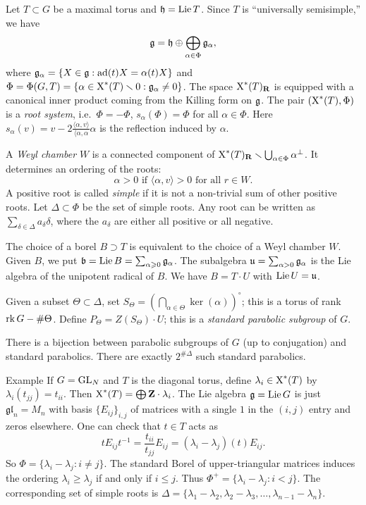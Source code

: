 Let $T\subset G$ be a maximal torus and $\mathfrak{h}=\operatorname{Lie} T$. Since $T$ is 
``universally semisimple,'' we have 
\[
  \mathfrak{g} = \mathfrak{h}\oplus \bigoplus_{\alpha\in \Phi} \mathfrak{g}_\alpha,
\]
where $\mathfrak{g}_\alpha=\{X\in \mathfrak{g}:\operatorname{ad}(t) X = \alpha(t) X\}$ and 
$\Phi=\Phi(G,T)=\{\alpha\in \operatorname{X}^\ast(T)\smallsetminus 0:\mathfrak{g}_\alpha\ne 0\}$. 
The space $\operatorname{X}^\ast(T)_{\mathbf{R}}$ is equipped with a canonical inner product 
coming from the Killing form on $\mathfrak{g}$. The pair 
$(\operatorname{X}^\ast(T),\Phi)$ is a \emph{root system}, i.e.~$\Phi=-\Phi$, 
$s_\alpha(\Phi)=\Phi$ for all $\alpha\in \Phi$. Here 
$s_\alpha(v) = v-2\frac{\langle \alpha,v\rangle}{\langle \alpha,\alpha} \alpha$ 
is the reflection induced by $\alpha$. 

A \emph{Weyl chamber} $W$ is a connected component of 
$\operatorname{X}^\ast(T)_{\mathbf{R}}\smallsetminus \bigcup_{\alpha\in \Phi} \alpha^\bot$. 
It determines an ordering of the roots: 
\[
  \alpha>0\text{ if }\langle \alpha,v\rangle>0\text{ for all }r\in W.
\]
A positive root is called \emph{simple} if it is not a non-trivial sum of 
other positive roots. Let $\Delta\subset \Phi$ be the set of simple roots. 
Any root can be written as $\sum_{\delta\in \Delta} a_\delta \delta$, where the 
$a_\delta$ are either all positive or all negative. 

The choice of a borel $B\supset T$ is equivalent to the choice of a Weyl chamber 
$W$. Given $B$, we put $\mathfrak{b}=\operatorname{Lie} B=\sum_{\alpha\geqslant 0} \mathfrak{g}_\alpha$. The 
subalgebra $\mathfrak{u}=\sum_{\alpha>0} \mathfrak{g}_\alpha$ is the Lie algebra of the unipotent 
radical of $B$. We have $B=T\cdot U$ with $\operatorname{Lie} U=\mathfrak{u}$. 

Given a subset $\Theta\subset \Delta$, set 
$S_\Theta=\left(\bigcap_{\alpha\in \Theta}\ker(\alpha)\right)^\circ$; this 
is a torus of rank $\operatorname{rk} G-\#\Theta$. Define 
$P_\Theta = Z(S_\Theta)\cdot U$; this is a \emph{standard parabolic subgroup} 
of $G$. 

\begin{theo}
There is a bijection between parabolic subgroups of $G$ (up to conjugation) 
and standard parabolics. There are exactly $2^{\# \Delta}$ such standard 
parabolics. 
\end{theo}

\begin{enonce}[remark]{Example}
If $G=\operatorname{GL}_N$ and $T$ is the diagonal torus, define  
$\lambda_i\in \operatorname{X}^\ast(T)$ by $\lambda_i(t_{j j}) = t_{i i}$. Then 
$\operatorname{X}^\ast(T)=\bigoplus \mathbf{Z}\cdot \lambda_i$. The Lie algebra 
$\mathfrak{g}=\operatorname{Lie} G$ is just $\mathfrak{gl}_n=M_n$ with basis 
$\{E_{i j}\}_{i,j}$ of matrices with a single $1$ in the $(i,j)$ entry 
and zeros elsewhere. One can check that $t\in T$ acts as 
\[
  t E_{i j} t^{-1} = \frac{t_{ii}}{t_{jj}} E_{i j} = (\lambda_i-\lambda_j)(t) E_{i j} .
\]
So $\Phi=\{\lambda_i-\lambda_j:i\ne j\}$. The standard Borel of upper-triangular 
matrices induces the ordering $\lambda_i\geqslant \lambda_j$ if and only if 
$i\leqslant j$. Thus $\Phi^+=\{\lambda_i-\lambda_j:i<j\}$. The corresponding set 
of simple roots is 
$\Delta=\{\lambda_1-\lambda_2,\lambda_2-\lambda_3,\dots,\lambda_{n-1}-\lambda_n\}$. 
\end{enonce}


